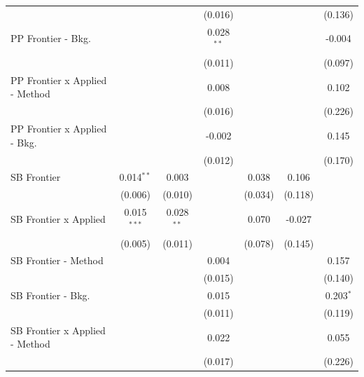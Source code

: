 \begin{tabular}{lcccccc}
                                  &               &               & (0.016)       &               &         & (0.136)\\   
   PP Frontier - Bkg.             &               &               & 0.028$^{**}$  &               &         & -0.004\\   
                                  &               &               & (0.011)       &               &         & (0.097)\\   
   PP Frontier x Applied - Method &               &               & 0.008         &               &         & 0.102\\   
                                  &               &               & (0.016)       &               &         & (0.226)\\   
   PP Frontier x Applied - Bkg.   &               &               & -0.002        &               &         & 0.145\\   
                                  &               &               & (0.012)       &               &         & (0.170)\\   
   SB Frontier                    & 0.014$^{**}$  & 0.003         &               & 0.038         & 0.106   &   \\   
                                  & (0.006)       & (0.010)       &               & (0.034)       & (0.118) &   \\   
   SB Frontier x Applied          & 0.015$^{***}$ & 0.028$^{**}$  &               & 0.070         & -0.027  &   \\   
                                  & (0.005)       & (0.011)       &               & (0.078)       & (0.145) &   \\   
   SB Frontier - Method           &               &               & 0.004         &               &         & 0.157\\   
                                  &               &               & (0.015)       &               &         & (0.140)\\   
   SB Frontier - Bkg.             &               &               & 0.015         &               &         & 0.203$^{*}$\\   
                                  &               &               & (0.011)       &               &         & (0.119)\\   
   SB Frontier x Applied - Method &               &               & 0.022         &               &         & 0.055\\   
                                  &               &               & (0.017)       &               &         & (0.226)\\   

\end{tabular}

